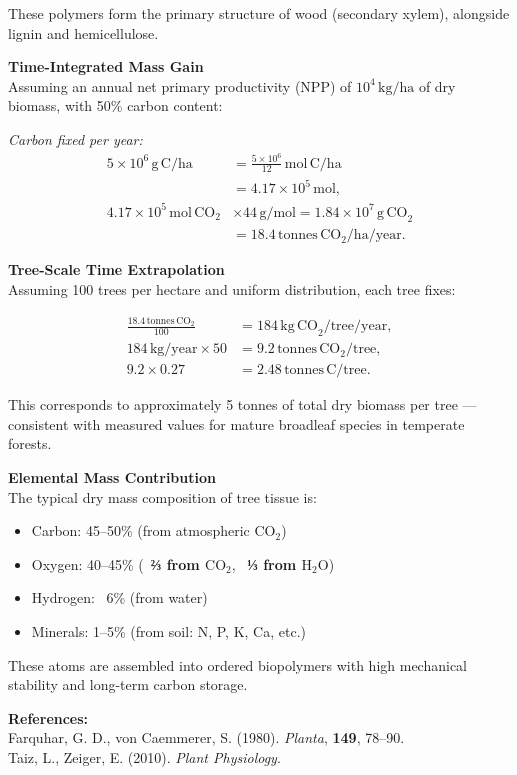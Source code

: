 \begin{technical}
These polymers form the primary structure of wood (secondary xylem), alongside lignin and hemicellulose.

\noindent\textbf{Time-Integrated Mass Gain}\\[0.5em]
Assuming an annual net primary productivity (NPP) of \(10^4\,\mathrm{kg/ha}\) of dry biomass, with 50\% carbon content:

\vspace{0.3em}
\noindent\textit{Carbon fixed per year:}
\begin{align}
5 \times 10^6\,\mathrm{g\,C/ha} 
&= \frac{5 \times 10^6}{12}\,\mathrm{mol\,C/ha} \nonumber \\
&= 4.17 \times 10^5\,\mathrm{mol}, \\
4.17 \times 10^5\,\mathrm{mol\,CO}_2 
&\times 44\,\mathrm{g/mol} 
= 1.84 \times 10^7\,\mathrm{g\,CO}_2 \\
&= 18.4\,\mathrm{tonnes\,CO}_2/\mathrm{ha}/\mathrm{year}.
\end{align}

\noindent\textbf{Tree-Scale Time Extrapolation}\\[0.5em]
Assuming 100 trees per hectare and uniform distribution, each tree fixes:

\begin{align}
\frac{18.4\,\mathrm{tonnes\,CO}_2}{100} 
&= 184\,\mathrm{kg\,CO}_2/\text{tree/year}, \\
184\,\mathrm{kg/year} \times 50 
&= 9.2\,\mathrm{tonnes\,CO}_2/\text{tree}, \\
9.2 \times 0.27 
&= 2.48\,\mathrm{tonnes\,C/tree}.
\end{align}

This corresponds to approximately 5 tonnes of total dry biomass per tree — consistent with measured values for mature broadleaf species in temperate forests.

\noindent\textbf{Elemental Mass Contribution}\\[0.5em]
The typical dry mass composition of tree tissue is:

\begin{itemize}[leftmargin=*]
  \item Carbon: 45–50\% (from atmospheric \(\mathrm{CO}_2\))
  \item Oxygen: 40–45\% (~\textbf{⅔ from \(\mathrm{CO}_2\)}, ~\textbf{⅓ from \(\mathrm{H}_2\mathrm{O}\)})
  \item Hydrogen: ~6\% (from water)
  \item Minerals: 1–5\% (from soil: N, P, K, Ca, etc.)
\end{itemize}

These atoms are assembled into ordered biopolymers with high mechanical stability and long-term carbon storage.

\vspace{0.5em}
\noindent\textbf{References:}\\
Farquhar, G. D., von Caemmerer, S. (1980). \textit{Planta}, \textbf{149}, 78–90.\\
Taiz, L., Zeiger, E. (2010). \textit{Plant Physiology}.
\end{technical}
